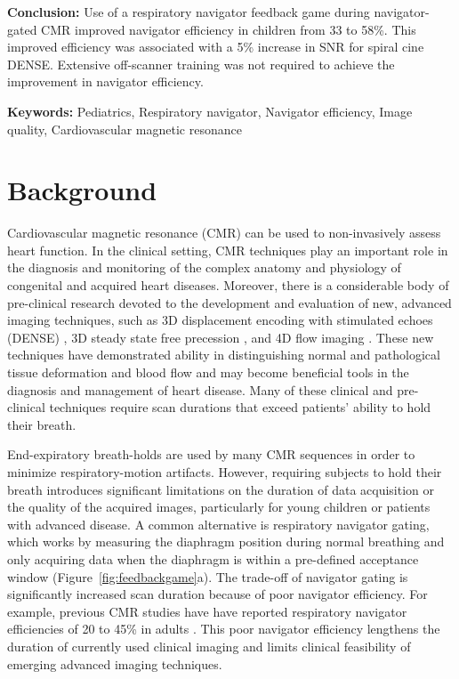 	\noindent \textbf{Conclusion:} Use of a respiratory navigator feedback game during navigator-gated CMR improved navigator efficiency in children from 33 to 58\%. This improved efficiency was associated with a 5\% increase in SNR for spiral cine DENSE. Extensive off-scanner training was not required to achieve the improvement in navigator efficiency.
	
	\noindent \textbf{Keywords:} Pediatrics, Respiratory navigator, Navigator efficiency, Image quality, Cardiovascular magnetic resonance\\
	
	\newpage

\section{Background}
	Cardiovascular magnetic resonance (CMR) can be used to non-invasively assess heart function. In the clinical setting, CMR techniques play an important role in the diagnosis and monitoring of the complex anatomy and physiology of congenital and acquired heart diseases. Moreover, there is a considerable body of pre-clinical research devoted to the development and evaluation of new, advanced imaging techniques, such as 3D displacement encoding with stimulated echoes (DENSE) \cite{Zhong2010a}, 3D steady state free precession \cite{Potthast2010}, and 4D flow imaging \cite{Markl2011}. These new techniques have demonstrated ability in distinguishing normal and pathological tissue deformation and blood flow and may become beneficial tools in the diagnosis and management of heart disease. Many of these clinical and pre-clinical techniques require scan durations that exceed patients' ability to hold their breath.
	
	End-expiratory breath-holds are used by many CMR sequences in order to minimize respiratory-motion artifacts. However, requiring subjects to hold their breath introduces significant limitations on the duration of data acquisition or the quality of the acquired images, particularly for young children or patients with advanced disease. A common alternative is respiratory navigator gating, which works by measuring the diaphragm position during normal breathing and only acquiring data when the diaphragm is within a pre-defined acceptance window (Figure~\ref{fig:feedbackgame}a). The trade-off of navigator gating is significantly increased scan duration because of poor navigator efficiency. For example, previous CMR studies have have reported respiratory navigator efficiencies of 20 to 45\% in adults \cite{Abd-Elmoniem2011,Feuerlein2009,Jhooti2011,Wang1996}. This poor navigator efficiency lengthens the duration of currently used clinical imaging and limits clinical feasibility of emerging advanced imaging techniques.
	
